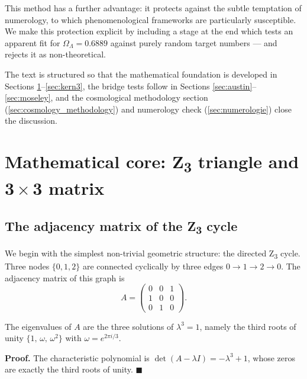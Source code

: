 This method has a further advantage: it protects against the subtle temptation of numerology, to which phenomenological frameworks are particularly susceptible. We make this protection explicit by including a stage at the end which tests an apparent fit for \(\Omega_\Lambda = 0.6889\) against purely random target numbers --- and rejects it as non-theoretical.

The text is structured so that the mathematical foundation is developed in Sections \ref{sec:kern1}--\ref{sec:kern3}, the bridge tests follow in Sections \ref{sec:austin}--\ref{sec:moseley}, and the cosmological methodology section (\ref{sec:cosmology_methodology}) and numerology check (\ref{sec:numerologie}) close the discussion.

\section[Mathematical core: Z3 triangle and 3 x 3 matrix]{Mathematical core: Z\textsubscript{3} triangle and 3\texorpdfstring{\,\(\times\)\,}{ x }3 matrix}
\label{sec:kern1}

\subsection[The adjacency matrix of the Z3 cycle]{The adjacency matrix of the Z\textsubscript{3} cycle}

We begin with the simplest non-trivial geometric structure: the directed Z\textsubscript{3} cycle. Three nodes \(\{0, 1, 2\}\) are connected cyclically by three edges \(0 \to 1 \to 2 \to 0\). The adjacency matrix of this graph is
\begin{equation}
A = \begin{pmatrix} 0 & 0 & 1 \\ 1 & 0 & 0 \\ 0 & 1 & 0 \end{pmatrix}.
\label{eq:A}
\end{equation}

\begin{foundation}
The eigenvalues of \(A\) are the three solutions of \(\lambda^3 = 1\), namely the third roots of unity \(\{1,\, \omega,\, \omega^2\}\) with \(\omega = e^{2\pi i / 3}\).
\end{foundation}

\noindent\textbf{Proof.} The characteristic polynomial is \(\det(A - \lambda I) = -\lambda^3 + 1\), whose zeros are exactly the third roots of unity. \(\blacksquare\)

